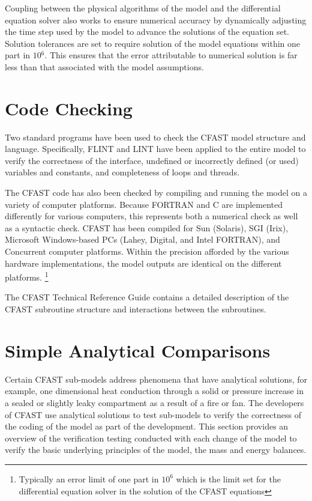 Coupling between the physical algorithms of the model and the differential equation solver also works to ensure numerical accuracy by dynamically adjusting the time step used by the model to advance the solutions of the equation set. Solution tolerances are set to require solution of the model equations within one part in $10{^6}$. This ensures that the error attributable to numerical solution is far less than that associated with the model assumptions.

\section{Code Checking}
Two standard programs have been used to check the CFAST model structure and language.  Specifically, FLINT and LINT have been applied to the entire model to verify the correctness of the interface, undefined or incorrectly defined (or used) variables and constants, and completeness of loops and threads.

The CFAST code has also been checked by compiling and running the model on a variety of computer platforms.  Because FORTRAN and C are implemented differently for various computers, this represents both a numerical check as well as a syntactic check.  CFAST has been compiled for Sun (Solaris), SGI (Irix), Microsoft Windows-based PCs (Lahey, Digital, and Intel FORTRAN), and Concurrent computer platforms.  Within the precision afforded by the various hardware implementations, the model outputs are identical on the different platforms. \footnote{Typically an error limit of one part in $10^6$ which is the limit set for the differential equation solver in the solution of the CFAST equations}

The CFAST Technical Reference Guide \cite{CFAST_Tech_Guide_6} contains a detailed description of the CFAST subroutine structure and interactions between the subroutines.

\section{Simple Analytical Comparisons}

Certain CFAST sub-models address phenomena that have analytical solutions, for example, one dimensional heat conduction through a solid or pressure increase in a sealed or slightly leaky compartment as a result of a fire or fan.  The developers of CFAST use analytical solutions to test sub-models to verify the correctness of the coding of the model as part of the development. This section provides an overview of the verification testing conducted with each change of the model to verify the basic underlying principles of the model, the mass and energy balances.


